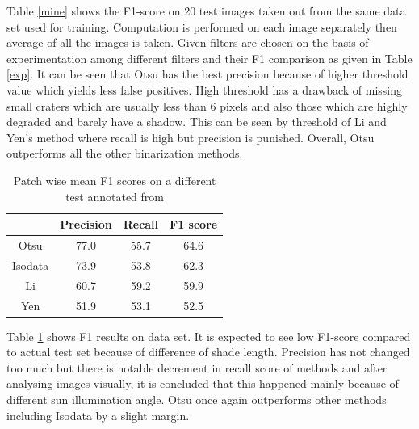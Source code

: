 \documentclass[11pt]{article}
\begin{document}
Table \ref{mine} shows the F1-score on 20 test images taken out from the same data set used for training. Computation is performed on each image separately then average of all the images is taken. Given filters are chosen on the basis of experimentation among different filters and their F1 comparison as given in Table \ref{exp}. It can be seen that Otsu has the best precision because of higher threshold value which yields less false positives. High threshold has a drawback of missing small craters which are usually less than 6 pixels and also those which are highly degraded and barely have a shadow. This can be seen by threshold of Li and Yen's method where recall is high but precision is punished. Overall, Otsu outperforms all the other binarization methods.

\begin{table}[H]
	\centering
	\caption{Patch wise mean F1 scores on a different test annotated from \cite{dino2020}}
	\begin{tabular}{c|c|c|c|}
		\cline{2-4}
		\multicolumn{1}{l|}{}         & Precision & Recall & F1 score \\ \hline
		\multicolumn{1}{|c|}{Otsu}    & 77.0      & 55.7   & 64.6     \\ \hline
		\multicolumn{1}{|c|}{Isodata} & 73.9      & 53.8   & 62.3     \\ \hline
		\multicolumn{1}{|c|}{Li}      & 60.7      & 59.2   & 59.9     \\ \hline
		\multicolumn{1}{|c|}{Yen}     & 51.9      & 53.1   & 52.5     \\ \hline
	\end{tabular}
\label{dino}
\end{table}

Table \ref{dino} shows F1 results on \cite{dino2020} data set. It is expected to see low F1-score compared to actual test set because of difference of shade length. Precision has not changed too much but there is notable decrement in recall score of methods and after analysing images visually, it is concluded that this happened mainly because of different sun illumination angle. Otsu once again outperforms other methods including Isodata by a slight margin.
\end{document}
